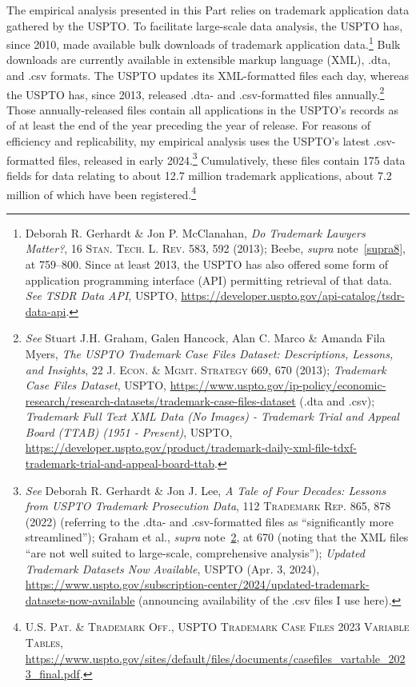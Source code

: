 \documentclass[letterpaper, 11pt, oneside]{article}
\begin{document}
The empirical analysis presented in this Part relies on trademark application data gathered by the USPTO. To facilitate large-scale data analysis, the USPTO has, since 2010, made available bulk downloads of trademark application data.\footnote{\label{supra21} Deborah R. Gerhardt \& Jon P. McClanahan, \textit{Do Trademark Lawyers Matter?}, 16 \textsc{Stan. Tech. L. Rev.} 583, 592 (2013); Beebe, \textit{supra} note~\ref{supra8}, at 759–800. Since at least 2013, the USPTO has also offered some form of application programming interface (API) permitting retrieval of that data. \textit{See TSDR Data API}, USPTO, \url{https://developer.uspto.gov/api-catalog/tsdr-data-api}.} Bulk downloads are currently available in extensible markup language (XML), .dta, and .csv formats. The USPTO updates its XML-formatted files each day, whereas the USPTO has, since 2013, released .dta- and .csv-formatted files annually.\footnote{\label{supra22} \textit{See} Stuart J.H. Graham, Galen Hancock, Alan C. Marco \& Amanda Fila Myers, \textit{The USPTO Trademark Case Files Dataset: Descriptions, Lessons, and Insights}, 22 \textsc{J. Econ. \& Mgmt. Strategy} 669, 670 (2013); \textit{Trademark Case Files Dataset}, USPTO, \url{https://www.uspto.gov/ip-policy/economic-research/research-datasets/trademark-case-files-dataset} (.dta and .csv); \textit{Trademark Full Text XML Data (No Images) - Trademark Trial and Appeal Board (TTAB) (1951 - Present)}, USPTO, \url{https://developer.uspto.gov/product/trademark-daily-xml-file-tdxf-trademark-trial-and-appeal-board-ttab}.} Those annually-released files contain all applications in the USPTO's records as of at least the end of the year preceding the year of release. For reasons of efficiency and replicability, my empirical analysis uses the USPTO's latest .csv-formatted files, released in early 2024.\footnote{\textit{See} Deborah R. Gerhardt \& Jon J. Lee, \textit{A Tale of Four Decades: Lessons from USPTO Trademark Prosecution Data}, 112 \textsc{Trademark Rep.} 865, 878 (2022) (referring to the .dta- and .csv-formatted files as ``significantly more streamlined''); Graham et al., \textit{supra} note~\ref{supra22}, at 670 (noting that the XML files ``are not well suited to large-scale, comprehensive analysis''); \textit{Updated Trademark Datasets Now Available}, USPTO (Apr. 3, 2024), \url{https://www.uspto.gov/subscription-center/2024/updated-trademark-datasets-now-available} (announcing availability of the .csv files I use here).} Cumulatively, these files contain 175 data fields for data relating to about 12.7 million trademark applications, about 7.2 million of which have been registered.\footnote{\textsc{U.S. Pat. \& Trademark Off., USPTO Trademark Case Files 2023 Variable Tables}, \url{https://www.uspto.gov/sites/default/files/documents/casefiles_vartable_2023_final.pdf}.}
\end{document}
